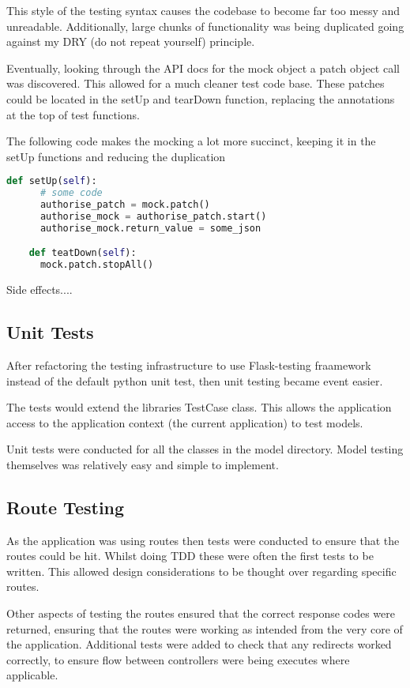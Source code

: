 This style of the testing syntax causes the codebase to become far too messy and unreadable. Additionally, large chunks of functionality was being duplicated going against my DRY (do not repeat yourself) principle.

Eventually, looking through the API docs for the mock object a patch object call was discovered. This allowed for a much cleaner test code base. These patches could be located in the setUp and tearDown function, replacing the annotations at the top of test functions.

The following code makes the mocking a lot more succinct, keeping it in the setUp functions and reducing the duplication

\begin{lstlisting}[language=python]
    def setUp(self):
      # some code
      authorise_patch = mock.patch()
      authorise_mock = authorise_patch.start()
      authorise_mock.return_value = some_json

    def teatDown(self):
      mock.patch.stopAll()
\end{lstlisting}

Side effects....

\subsection{Unit Tests}
After refactoring the testing infrastructure to use Flask-testing fraamework instead of the default python unit test, then unit testing became event easier.

The tests would extend the libraries TestCase class. This allows the application access to the application context (the current application) to test models.

Unit tests were conducted for all the classes in the model directory. Model testing themselves was relatively easy and simple to implement.

\subsection{Route Testing}
As the application was using routes then tests were conducted to ensure that the routes could be hit. Whilst doing TDD these were often the first tests to be written. This allowed design considerations to be thought over regarding specific routes.

Other aspects of testing the routes ensured that the correct response codes were returned, ensuring that the routes were working as intended from the very core of the application. Additional tests were added to check that any redirects worked correctly, to ensure flow between controllers were being executes where applicable.

